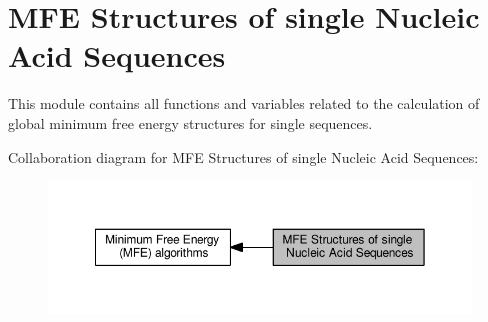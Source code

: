 \hypertarget{group__mfe__fold__single}{}\section{M\+FE Structures of single Nucleic Acid Sequences}
\label{group__mfe__fold__single}


This module contains all functions and variables related to the calculation of global minimum free energy structures for single sequences.  


Collaboration diagram for M\+FE Structures of single Nucleic Acid Sequences\+:
\nopagebreak
\begin{figure}[H]
\begin{center}
\leavevmode
\includegraphics[width=350pt]{group__mfe__fold__single}
\end{center}
\end{figure}
